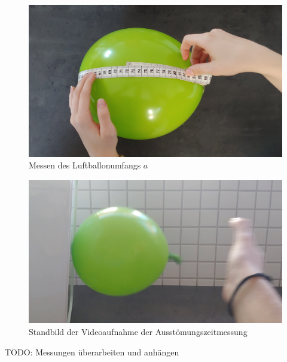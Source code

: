 \documentclass{article}
\begin{document}
    \printbibliography[title={Quellen}]

    \begin{figure}[h!]\label{fig:Umfang}
        \centering
        \includegraphics[width=\textwidth]{luftballon_umfang_messung.jpg}
        \caption{Messen des Luftballonumfangs \(a\)}
    \end{figure}

    \begin{figure}[h!]\label{fig:Festgeklebt}
        \centering
        \includegraphics[width=\textwidth]{lufballon_festgeklebt.png}
        \caption{Standbild der Videoaufnahme der Ausstömungszeitmessung}
    \end{figure}

    TODO: Messungen überarbeiten und anhängen
    
\end{document}
